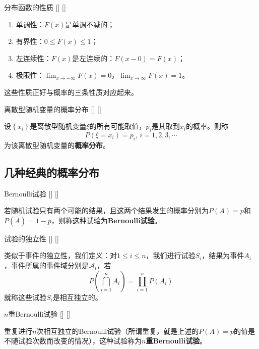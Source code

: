 \documentclass[UTF8]{ctexart}
\begin{document}
        \begin{ppt}
            []
            {分布函数的性质}
            []
            []


            \begin{enumerate}
                \item 单调性：$F(x)$是单调不减的；
                \item 有界性：$0\leq F(x)\leq 1$；
                \item 左连续性：$F(x)$是左连续的：$F(x-0)=F(x)$；
                \item 极限性：$\lim_{x\to-\infty}F(x)=0$，$\lim_{x\to\infty}F(x)=1$。
            \end{enumerate}
        \end{ppt}

        这些性质正好与概率的三条性质对应起来。

        \begin{dfn}
            []
            {离散型随机变量的概率分布}
            []
            []


            设$\left\{x_i\right\} $是离散型随机变量$\xi$的所有可能取值，$p_i$是其取到$x_i$的概率。则称
            \[P(\xi=x_i)=p_i,\,i=1,2,3,\cdots\]为该离散型随机变量的\textbf{概率分布}。
        \end{dfn}

    \subsection{几种经典的概率分布}
        \begin{dfn}
            []
            {Bernoulli试验}
            []
            []


            若随机试验只有两个可能的结果，且这两个结果发生的概率分别为$P(A)=p$和$P(\bar{A})=1-p$，则称这种试验为\textbf{Bernoulli试验}。
        \end{dfn}

        \begin{dfn}
            []
            {试验的独立性}
            []
            []


            类似于事件的独立性，我们定义：对$1\leq i\leq n$，我们进行试验$S_i$，结果为事件$A_i$，事件所属的事件域分别是$\mathcal{A}_i$，若\[P\left(\bigcap^{n}_{i=1} A_i\right) =\prod_{i=1}^{n}P(A_i)\]
            就称这些试验$S_i$是相互独立的。
        \end{dfn}

        \begin{dfn}
            []
            {$n$重Bernoulli试验}
            []
            []


            重复进行$n$次相互独立的Bernoulli试验（所谓重复，就是上述的$P(A)=p$的值是不随试验次数而改变的情况），这种试验称为\textbf{$n$重Bernoulli试验}。
        \end{dfn}
\end{document}
